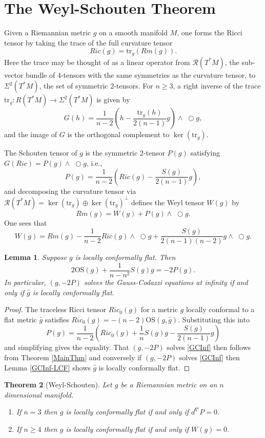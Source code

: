 \documentclass{amsart}
\newcommand{\tr}{\mathrm{tr}}
\newcommand{\wtimes}{\wedge \!\!\!\!\!\!\!\!\;\bigcirc}
\newtheorem{thm}{Theorem}[section]
\newtheorem{lem}[thm]{Lemma}
\begin{document}
\section{The Weyl-Schouten Theorem}

Given a Riemannian metric $g$ on a smooth manifold $M$, one forms the Ricci tensor by taking the trace of the full curvature tensor 
\[
Ric(g) = \tr_g(Rm(g)).
\]
Here the trace may be thought of as a linear operator from $\mathcal{R}(T^*M)$, the sub-vector bundle of 4-tensors with the same symmetries as the curvature tensor, to $\Sigma^2(T^*M)$, the set of symmetric 2-tensors.
For $n\geq 3$, a right inverse of the trace $\tr_g: R(T^*M) \to \Sigma^2(T^*M)$ is given by 
\[
G(h) = \frac{1}{n-2}\left( h - \frac{\tr_g(h)}{2(n-1)} g \right) \wtimes g,
\]
and the image of $G$ is the orthogonal complement to $\ker(\tr_g)$.

The Schouten tensor of $g$ is the symmetric 2-tensor $P(g)$ satisfying $G(Ric) = P(g) \wtimes g$, i.e., 
\[
P(g) = \frac{1}{n-2}\left( Ric(g) - \frac{S(g)}{2(n-1)} g \right),
\]
and decomposing the curvature tensor via $\mathcal{R}(T^*M) = \ker(\tr_g) \oplus \ker(\tr_g)^\perp$ defines the Weyl tensor $W(g)$ by 
\[
Rm(g) = W(g) + P(g)\wtimes g.
\]
One sees that 
\[
W(g) = Rm(g) - \frac{1}{n-2}Ric(g) \wtimes g + \frac{S(g)}{2(n-1)(n-2)} g \wtimes g.
\]

\begin{lem}
\label{SchoutenSolves}
Suppose $g$ is locally conformally flat. Then 
\[
2\mathrm{OS}(g) + \frac{1}{n-n^2}S(g)g = -2 P(g). 
\]
In particular, $(g,-2P)$ solves the Gauss-Codazzi equations at infinity if and only if $\hat{g}$ is locally conformally flat. 
\end{lem}

\begin{proof}
The traceless Ricci tensor $Ric_0(g)$ for a metric $g$ locally conformal to a flat metric $\bar{g}$ satisfies $Ric_0(g) = -(n-2)\mathrm{OS}(g,\bar{g})$.
Substituting this into
\[
P(g) = \frac{1}{n-2}\left( Ric_0(g) + \frac{1}{n}S(g)g - \frac{S(g)}{2(n-1)} g \right)
\]
and simplifying gives the equality.
That $(g,-2P)$ solves \ref{GCInf} then follows from Theorem \ref{MainThm} and conversely if $(g,-2P)$ solves \ref{GCInf} then Lemma \ref{GCInf-LCF} shows $\hat{g}$ is locally conformally flat. 
\end{proof}

\begin{thm}[Weyl-Schouten]
Let $g$ be a Riemannian metric on an $n$ dimensional manifold.

\begin{enumerate}
\item If $n = 3$ then $g$ is locally conformally flat if and only if $d^\nabla P = 0$.

\item If $n \geq 4$ then $g$ is locally conformally flat if and only if $W(g) = 0$.

\end{enumerate}
\end{thm}
\end{document}
